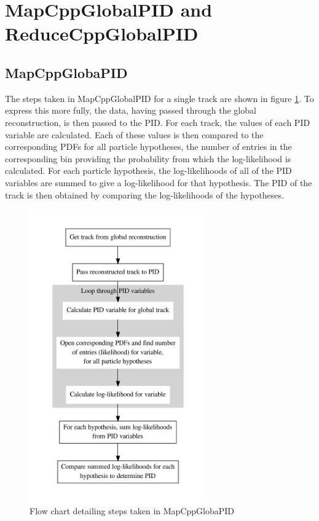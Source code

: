 \section{MapCppGlobalPID and ReduceCppGlobalPID}
\label{pid_mapred}
\subsection{MapCppGlobaPID}
\label{pid_map}
The steps taken in MapCppGlobalPID for a single track are shown in 
figure \ref{mapflow}. To express this more fully, the data, having passed through the global reconstruction, is then passed to the PID. For each track, the values of each PID variable are calculated. Each of these values is then compared to the corresponding PDFs for all particle hypotheses, the number of entries in the corresponding bin providing the probability from which the log-likelihood is calculated. For each particle hypothesis, the log-likelihoods of all of the PID variables are summed to give a log-likelihood for that hypothesis. The PID of the track is then obtained by comparing the log-likelihoods of the hypotheses.
\begin{figure}[h!]
\begin{center} 
\includegraphics[width=3in]{reconstruction/globalpid/PIDflow.pdf} 
\caption{Flow chart detailing steps taken in MapCppGlobaPID}
\label{mapflow}
\end{center} 
\end{figure}

